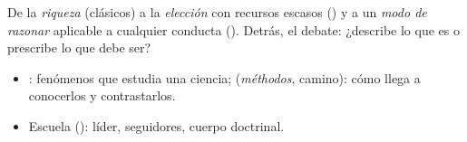 \documentclass{article}
\begin{document}
\begin{columnas}
\begin{ideaclave}
De la \emph{riqueza} (clásicos) a la \emph{elección} con recursos escasos () y a un \emph{modo de razonar} aplicable a cualquier conducta (). Detrás, el debate: ¿describe lo que es o prescribe lo que debe ser?
\end{ideaclave}
\begin{itemize}
\item {}: fenómenos que estudia una ciencia;  (\emph{méthodos}, camino): cómo llega a conocerlos y contrastarlos.
\item Escuela (): líder, seguidores, cuerpo doctrinal.
\end{itemize}


\end{columnas}
\end{document}
